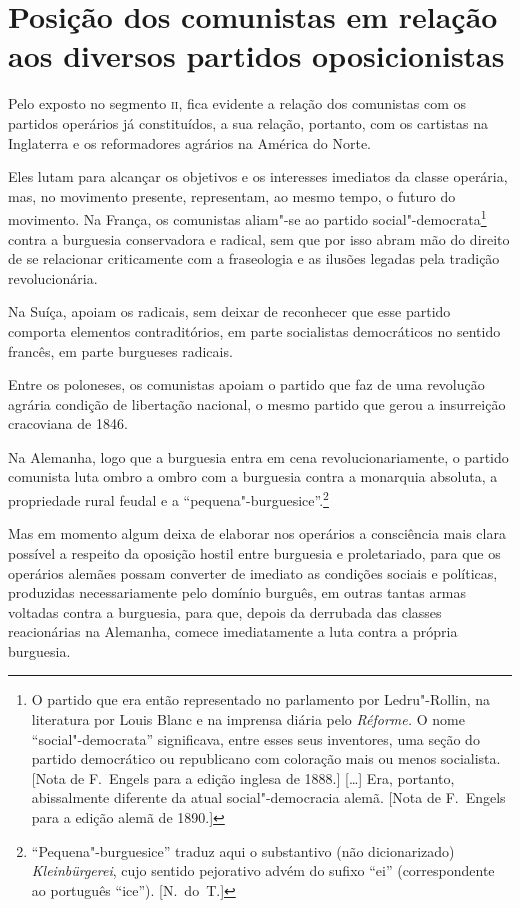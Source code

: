\section{Posição dos comunistas em relação aos diversos partidos oposicionistas}

Pelo exposto no segmento \textsc{ii}, fica evidente a relação dos comunistas 
com os partidos operários já constituídos, a sua relação, portanto, 
com os cartistas na Inglaterra e os reformadores agrários na América do
Norte.

Eles lutam para alcançar os objetivos e os interesses imediatos
da classe operária, mas, no movimento presente, representam, ao mesmo
tempo, o futuro do movimento. Na França, os comunistas aliam"-se ao
partido social"-democrata\footnote{ O partido que era então representado 
no parlamento por Ledru"-Rollin, na literatura por Louis Blanc e na 
imprensa diária pelo \textit{Réforme.} O nome “social"-democrata” 
significava, entre esses seus inventores, uma seção do partido 
democrático ou republicano com coloração mais ou menos socialista. 
[Nota de F.~Engels para a edição inglesa de 1888.] [\ldots] Era, portanto, abissalmente diferente da atual social"-democracia 
alemã. [Nota de F.~Engels para a edição alemã de 1890.]}
contra a burguesia conservadora e radical, sem que por isso abram mão do direito 
de se relacionar criticamente com a
fraseologia e as ilusões legadas pela tradição revolucionária.

Na Suíça, apoiam os radicais, sem deixar de reconhecer que esse partido
comporta elementos contraditórios, em parte socialistas democráticos no
sentido francês, em parte burgueses radicais.

Entre os poloneses, os comunistas apoiam o partido que faz de uma
revolução agrária condição de libertação nacional, o mesmo partido que
gerou a insurreição cracoviana de 1846.

Na Alemanha, logo que a burguesia entra em cena revolucionariamente, o 
partido comunista luta ombro a ombro com a burguesia contra a monarquia absoluta, 
a propriedade rural feudal e a “pequena"-burguesice”.\footnote{ “Pequena"-burguesice” traduz aqui o substantivo (não dicionarizado) \textit{Kleinbürgerei}, 
cujo sentido pejorativo advém do sufixo “ei” (correspondente ao português “ice”). [N.~do~T.]}

Mas em momento algum deixa de elaborar nos operários a consciência mais clara possível a respeito da oposição hostil entre burguesia e
proletariado, para que os operários alemães possam converter de
imediato as condições sociais e políticas, produzidas necessariamente
pelo domínio burguês, em outras tantas armas voltadas contra a
burguesia, para que, depois da derrubada das classes reacionárias na
Alemanha, comece imediatamente a luta contra a própria burguesia.

